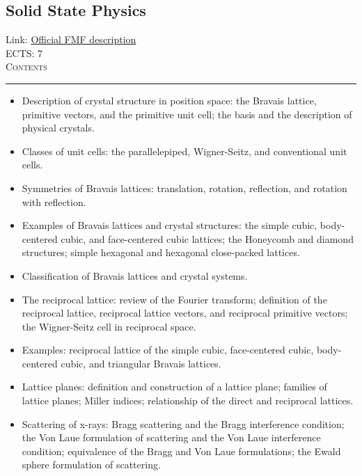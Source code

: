 \documentclass[11pt, a4paper]{article}
\newenvironment{course}[3]{
\subsection{#1}%
Link: \href{#2}{Official FMF description}\\%
ECTS: #3%
\vspace{1ex}
\\
{\large \textsc{Contents}}\\[-0.9ex]%
\rule{\textwidth}{0.5pt}
\vspace{-3ex}
}
{}
\newenvironment{chapter}[1]{
\begin{tcolorbox}[title=#1, breakable]
}
{\end{tcolorbox}}
\begin{document}
\begin{course}{Solid State Physics}{https://www.fmf.uni-lj.si/en/study-physics/programmes/1fiz/2020/7000777/courses/1138/}{7}
    \label{solid_state_physics}
    \begin{chapter}{Crystal structure}
        \begin{itemize}
        
            \item Description of crystal structure in position space: the Bravais lattice, primitive vectors, and the primitive unit cell; the basis and the description of physical crystals.

            \item Classes of unit cells: the parallelepiped, Wigner-Seitz, and conventional unit cells.

            \item Symmetries of Bravais lattices: translation, rotation, reflection, and rotation with reflection.

            \item Examples of Bravais lattices and crystal structures: the simple cubic, body-centered cubic, and face-centered cubic lattices; the Honeycomb and diamond structures; simple hexagonal and hexagonal close-packed lattices.

            \item Classification of Bravais lattices and crystal systems.

            \item The reciprocal lattice: review of the Fourier transform; definition of the reciprocal lattice, reciprocal lattice vectors, and reciprocal primitive vectors; the Wigner-Seitz cell in reciprocal space.

            \item Examples: reciprocal lattice of the simple cubic, face-centered cubic, body-centered cubic, and triangular Bravais lattices.

            \item Lattice planes: definition and construction of a lattice plane; families of lattice planes; Miller indices; relationship of the direct and reciprocal lattices.

            \item Scattering of x-rays: Bragg scattering and the Bragg interference condition; the Von Laue formulation of scattering and the Von Laue interference condition; equivalence of the Bragg and Von Laue formulations; the Ewald sphere formulation of scattering.


\end{itemize}
\end{chapter}
\end{course}
\end{document}
